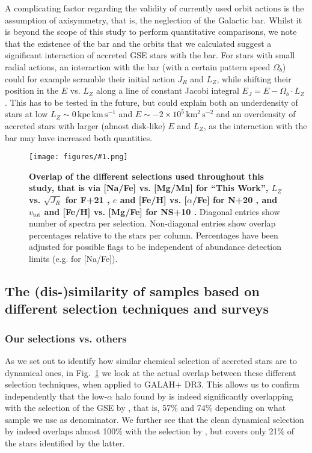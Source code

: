 \documentclass[fleqn,usenatbib]{mnras}
\newcommand{\kpckms}{\,\mathrm{kpc\,km\,s^{-1}}}	%
\newcommand{\kmkmss}{\,\mathrm{km^2\,s^{-2}}}	%
\newcommand{\codeicon}{{\faCloudDownload}}
\newcommand{\codelink}[1]{\href{https://github.com/svenbuder/Accreted-stars-in-GALAH-DR3/tree/main/figures/#1.ipynb}{\codeicon}\,\,}
\newcommand{\oscaption}[2]{\caption{#2 \codelink{#1}}}
\newcommand{\figurecolumnwidth}[3]{\begin{figure} \centering \texttt{[image: figures/\#1.png]}\oscaption{#2}{#3}\label{fig:#1} \end{figure}}
\begin{document}
A complicating factor regarding the validity of currently used orbit actions is the assumption of axisymmetry, that is, the neglection of the Galactic bar. Whilst it is beyond the scope of this study to perform quantitative comparisons, we note that the existence of the bar and the orbits that we calculated suggest a significant interaction of accreted GSE stars with the bar. For stars with small radial actions, an interaction with the bar (with a certain pattern speed $\Omega_b$) could for example scramble their initial action $J_R$ and $L_Z$, while shifting their position in the $E$ vs. $L_Z$ along a line of constant Jacobi integral $E_J = E - \Omega_b \cdot L_Z$ \citep{Binney2008}. This has to be tested in the future, but could explain both an underdensity of stars at low $L_Z \sim 0 \kpckms$ and $E \sim -2\times10^5 \kmkmss $ and an overdensity of accreted stars with larger (almost disk-like) $E$ and $L_Z$, as the interaction with the bar may have increased both quantities.

\figurecolumnwidth{selection_overlap}{chronochemodynamic_comparison}{
\textbf{Overlap of the different selections used throughout this study, that is via [Na/Fe] vs. [Mg/Mn] for ``This Work'', $L_Z$ vs. $\sqrt{J_R}$ for F+21 \citep{Feuillet2021}, $e$ and [Fe/H] vs. [$\alpha$/Fe] for N+20 \citep{Naidu2020}, and $v_\text{tot}$ and [Fe/H] vs. [Mg/Fe] for NS+10 \citep{Nissen2010}.} Diagonal entries show number of spectra per selection. Non-diagonal entries show overlap percentages relative to the stars per column. Percentages have been adjusted for possible flags to be independent of abundance detection limits (e.g. for [Na/Fe]). 
}

\subsection{The (dis-)similarity of samples based on different selection techniques and surveys} \label{sec:dissimilarity}

\subsubsection{Our selections vs. others}

As we set out to identify how similar chemical selection of accreted stars are to dynamical ones, in Fig.~\ref{fig:selection_overlap} we look at the actual overlap between these different selection techniques, when applied to GALAH+ DR3. This allows us to confirm independently that the low-$\alpha$ halo found by \citet{Nissen2010} is indeed significantly overlapping with the selection of the GSE by \citet{Naidu2020}, that is, 57\% and 74\% depending on what sample we use as denominator. We further see that the clean dynamical selection by \citet{Feuillet2021} indeed overlaps almost 100\% with the selection by \citet{Naidu2020}, but covers only 21\% of the stars identified by the latter.
\end{document}
